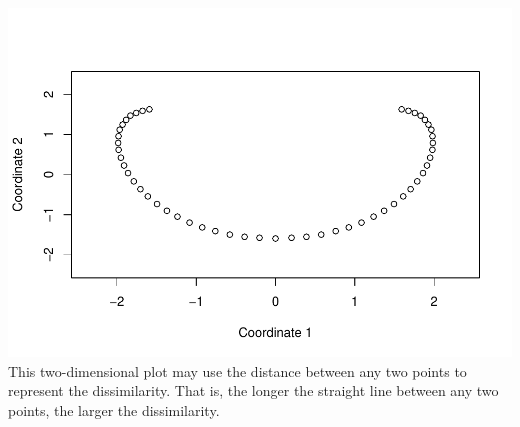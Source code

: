 \documentclass[
]{article}
\newenvironment{Shaded}{\begin{snugshade}}{\end{snugshade}}
\newcommand{\AttributeTok}[1]{\textcolor[rgb]{0.77,0.63,0.00}{#1}}
\newcommand{\DecValTok}[1]{\textcolor[rgb]{0.00,0.00,0.81}{#1}}
\newcommand{\FloatTok}[1]{\textcolor[rgb]{0.00,0.00,0.81}{#1}}
\newcommand{\FunctionTok}[1]{\textcolor[rgb]{0.00,0.00,0.00}{#1}}
\newcommand{\NormalTok}[1]{#1}
\newcommand{\OtherTok}[1]{\textcolor[rgb]{0.56,0.35,0.01}{#1}}
\newcommand{\SpecialCharTok}[1]{\textcolor[rgb]{0.00,0.00,0.00}{#1}}
\newcommand{\StringTok}[1]{\textcolor[rgb]{0.31,0.60,0.02}{#1}}
\begin{document}
\begin{Shaded}
\end{Shaded}

\includegraphics{HUDM6122-Homework_04-Chenguang-Pan_files/figure-latex/unnamed-chunk-7-1.pdf}
This two-dimensional plot may use the distance between any two points to
represent the dissimilarity. That is, the longer the straight line
between any two points, the larger the dissimilarity.
\end{document}
